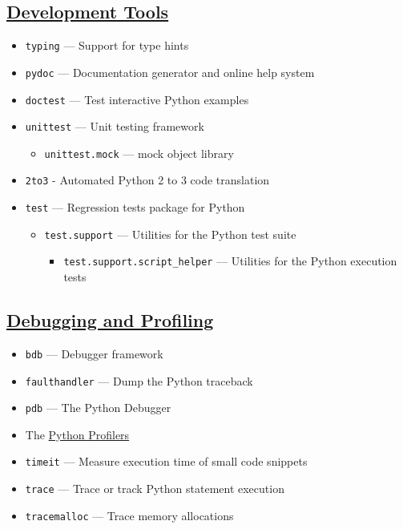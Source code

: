 \documentclass[]{book}
\providecommand{\tightlist}{%
  \setlength{\itemsep}{0pt}\setlength{\parskip}{0pt}}
\theoremstyle{definition}
\theoremstyle{definition}
\theoremstyle{definition}
\theoremstyle{remark}
\begin{document}
\subsection{\texorpdfstring{\href{https://docs.python.org/3.7/library/development.html}{Development
Tools}}{Development Tools}}\label{development-tools}

\begin{itemize}
\tightlist
\item
  \texttt{typing} --- Support for type hints
\item
  \texttt{pydoc} --- Documentation generator and online help system
\item
  \texttt{doctest} --- Test interactive Python examples
\item
  \texttt{unittest} --- Unit testing framework

  \begin{itemize}
  \tightlist
  \item
    \texttt{unittest.mock} --- mock object library
  \end{itemize}
\item
  \texttt{2to3} - Automated Python 2 to 3 code translation
\item
  \texttt{test} --- Regression tests package for Python

  \begin{itemize}
  \tightlist
  \item
    \texttt{test.support} --- Utilities for the Python test suite

    \begin{itemize}
    \tightlist
    \item
      \texttt{test.support.script\_helper} --- Utilities for the Python
      execution tests
    \end{itemize}
  \end{itemize}
\end{itemize}

\subsection{\texorpdfstring{\href{https://docs.python.org/3.7/library/debug.html}{Debugging
and Profiling}}{Debugging and Profiling}}\label{debugging-and-profiling}

\begin{itemize}
\tightlist
\item
  \texttt{bdb} --- Debugger framework
\item
  \texttt{faulthandler} --- Dump the Python traceback
\item
  \texttt{pdb} --- The Python Debugger
\item
  The \href{https://docs.python.org/3.7/library/othergui.html}{Python
  Profilers}
\item
  \texttt{timeit} --- Measure execution time of small code snippets
\item
  \texttt{trace} --- Trace or track Python statement execution
\item
  \texttt{tracemalloc} --- Trace memory allocations
\end{itemize}
\end{document}
